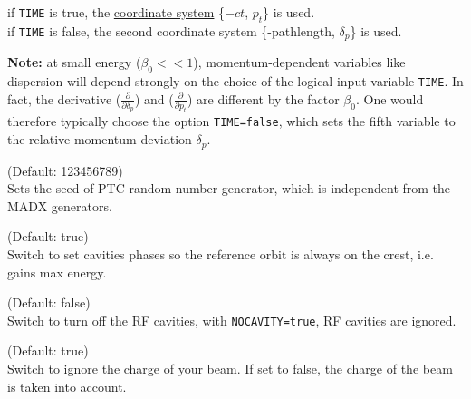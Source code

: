 \begin{madlist}
\begin{madlist}
	    if \texttt{TIME} is true, the
	   \hyperref[subsec:tables-canon]{\madx coordinate system}
	   \{$-ct$, $p_t$\} is used. \\
	   if \texttt{TIME} is false, the second \ptc coordinate system
	   \{-pathlength, $\delta_p$\} is used.
	 \end{madlist}

	\textbf{Note:} at small energy ($\beta_0 << 1$),
	momentum-dependent variables like dispersion will depend  strongly on
	the choice of  the logical input variable \texttt{TIME}. In fact, the
	derivative ($\frac{\partial}{\partial \delta_p}$)  and
	($\frac{\partial}{\partial p_t}$)  are different by the
	factor $\beta_0$. One would  therefore typically  choose
	the option \texttt{TIME=false},  which sets the fifth variable to
	the relative momentum deviation $\delta_p$.


	 (Default: 123456789)\\
	Sets the seed of PTC random number generator,
	which is independent from the MADX generators.

	 (Default: true)\\
	Switch to set cavities phases so the reference orbit is always on
	the crest, i.e. gains max energy.

   (Default: false)\\
  Switch to turn off the RF cavities, with \texttt{NOCAVITY=true}, 
  RF cavities are ignored.

   (Default: true)\\
  Switch to ignore the charge of your beam. If set to false, 
  the charge of the beam is taken into account.


\end{madlist}



